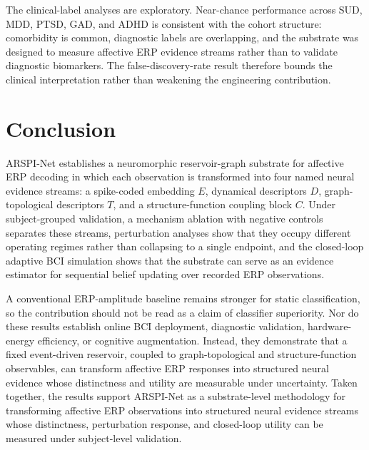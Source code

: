 \documentclass[journal]{IEEEtran}
\begin{document}
The clinical-label analyses are exploratory. Near-chance performance across SUD, MDD, PTSD, GAD, and ADHD is consistent with the cohort structure: comorbidity is common, diagnostic labels are overlapping, and the substrate was designed to measure affective ERP evidence streams rather than to validate diagnostic biomarkers. The false-discovery-rate result therefore bounds the clinical interpretation rather than weakening the engineering contribution.

\section{Conclusion}
ARSPI-Net establishes a neuromorphic reservoir-graph substrate for affective ERP decoding in which each observation is transformed into four named neural evidence streams: a spike-coded embedding $E$, dynamical descriptors $D$, graph-topological descriptors $T$, and a structure-function coupling block $C$. Under subject-grouped validation, a mechanism ablation with negative controls separates these streams, perturbation analyses show that they occupy different operating regimes rather than collapsing to a single endpoint, and the closed-loop adaptive BCI simulation shows that the substrate can serve as an evidence estimator for sequential belief updating over recorded ERP observations.

A conventional ERP-amplitude baseline remains stronger for static classification, so the contribution should not be read as a claim of classifier superiority. Nor do these results establish online BCI deployment, diagnostic validation, hardware-energy efficiency, or cognitive augmentation. Instead, they demonstrate that a fixed event-driven reservoir, coupled to graph-topological and structure-function observables, can transform affective ERP responses into structured neural evidence whose distinctness and utility are measurable under uncertainty. Taken together, the results support ARSPI-Net as a substrate-level methodology for transforming affective ERP observations into structured neural evidence streams whose distinctness, perturbation response, and closed-loop utility can be measured under subject-level validation.
\end{document}
